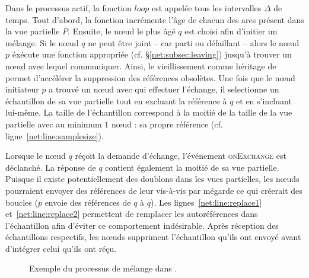 Dans le processus actif, la fonction $loop$ est appelée tous les intervalles
$\Delta$ de temps. Tout d'abord, la fonction incrémente l'âge de chacun des arcs
présent dans la vue partielle $P$. Ensuite, le nœud le plus âgé $q$ est choisi
afin d'initier un mélange. Si le nœud $q$ ne peut être joint -- car parti ou
défaillant -- alors le nœud $p$ éxécute une fonction appropriée (cf.
§\ref{net:subsec:leaving}) jusqu'à trouver un nœud avec lequel
communiquer. Ainsi, le vieillissement comme héritage de \CYCLON permet
d'accélérer la suppression des références obsolètes. Une fois que le nœud
initiateur $p$ a trouvé un nœud avec qui effectuer l'échange, il selectionne un
échantillon de sa vue partielle tout en excluant la référence à $q$ et en
s'incluant lui-même. La taille de l'échantillon correspond à la moitié de la
taille de la vue partielle avec au minimum $1$ nœud : sa propre référence
(cf. ligne~\ref{net:line:samplesize}).


Lorsque le nœud $q$ réçoit la demande d'échange, l'événement \textsc{onExchange}
est déclanché. La réponse de $q$ contient également la moitié de sa vue
partielle. Puisque il existe potentiellement des doublons dans les vues
partielles, les nœuds pourraient envoyer des références de leur vis-à-vis par
mégarde ce qui créerait des boucles ($p$ envoie des références de $q$ à
$q$). Les lignes~\ref{net:line:replace1} et~\ref{net:line:replace2} permettent de
remplacer les autoréférences dans l'échantillon afin d'éviter ce comportement
indésirable. Après réception des échantillons respectifs, les nœuds suppriment
l'échantillon qu'ils ont envoyé avant d'intégrer celui qu'ils ont réçu.

\begin{figure*}
  \centering
  \hspace{40pt}
  \hspace{10pt}
  \caption[Processus de mélange périodique de \SPRAY]
  {\label{net:fig:cyclicexample}Exemple du processus de mélange dans \SPRAY.}
\end{figure*}

